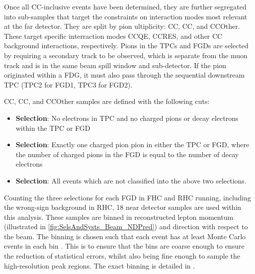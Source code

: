 Once all CC-inclusive events have been determined, they are further segregated into sub-samples that target the constraints on interaction modes most relevant at the far detector. They are split by pion ultiplicity: CC\quickmath{0\pi}, CC\quickmath{1\pi}, and CCOther. These target specific interraction modes CCQE, CCRES, and other CC background interactions, respectively. Pions in the TPCs and FGDs are selected by requiring a secondary track to be observed, which is separate from the muon track and is in the same beam spill window and sub-detector. If the pion originated within a FDG, it must also pass through the sequential downstream TPC (TPC2 for FGD1, TPC3 for FGD2). 

CC\quickmath{0\pi}, CC\quickmath{1\pi}, and CCOther samples are defined with the following cuts:

\begin{itemize}
\item \textbf{ Selection}: No electrons in TPC and no charged pions or decay electrons within the TPC or FGD
\item \textbf{ Selection}: Exactly one charged pion pion in either the TPC or FGD, where the number of charged pions in the FGD is equal to the number of decay electrons
\item \textbf{ Selection}: All events which are not classified into the above two selections.
\end{itemize}

Counting the three selections for each FGD in FHC and RHC running, including the wrong-sign background in RHC, 18 near detector samples are used within this analysis. These samples are binned in reconstructed lepton momentum (illustrated in \autoref{fig:SelsAndSysts_Beam_NDPred}) and direction with respect to the beam. The binning is chosen such that each event has at least  Monte Carlo events in each bin \cite{thesis_will}. This is to ensure that the bins are coarse enough to ensure the reduction of statistical errors, whilst also being fine enough to sample the high-resolution peak regions. The exact binning is detailed in \cite{thesis_will}.

